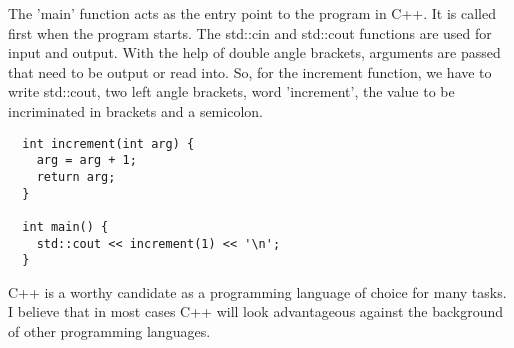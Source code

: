 \documentclass[a4paper, 14pt]{extarticle}
\begin{document}
The 'main' function acts as the entry point to the program in C++. It is called
first when the program starts. The std::cin and std::cout functions are used for
input and output. With the help of double angle brackets, arguments are passed
that need to be output or read into. So, for the increment function, we have to
write std::cout, two left angle brackets, word 'increment', the value to be
incriminated in brackets and a semicolon.

\begin{verbatim}
  int increment(int arg) {
    arg = arg + 1;
    return arg;
  }

  int main() {
    std::cout << increment(1) << '\n';
  }
\end{verbatim}

C++ is a worthy candidate as a programming language of choice for many tasks. I
believe that in most cases C++ will look advantageous against the background of
other programming languages.
\end{document}
